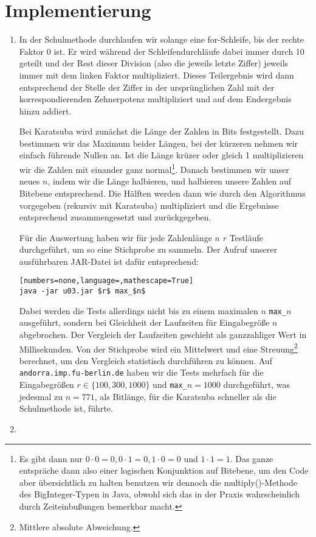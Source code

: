 \documentclass[a4paper,10pt]{scrartcl}
\begin{document}
\section{Implementierung}
\begin{enumerate}
\item   In der Schulmethode durchlaufen wir solange eine for-Schleife, bis der rechte Faktor 0 ist.
        Er wird während der Schleifendurchläufe dabei immer durch 10 geteilt und der Rest dieser Division (also die jeweils letzte Ziffer) jeweils immer mit dem linken Faktor multipliziert. Dieses Teilergebnis wird dann entsprechend der Stelle der Ziffer in der ursprünglichen Zahl mit der korrespondierenden Zehnerpotenz multipliziert und auf dem Endergebnis hinzu addiert.
        
        
        Bei Karatsuba wird zunächst die Länge der Zahlen in Bits festgestellt. Dazu bestimmen wir das Maximum beider Längen, bei der kürzeren nehmen wir einfach führende Nullen an. Ist die Länge krüzer oder gleich 1 multiplizieren wir die Zahlen mit einander ganz normal\footnote{Es gibt dann nur $0 \cdot 0 = 0, 0 \cdot 1 = 0, 1 \cdot 0 = 0$ und $1 \cdot 1 = 1$. Das ganze entspräche dann also einer logischen Konjunktion auf Bitebene, um den Code aber übersichtlich zu halten benutzen wir dennoch die multiply()-Methode des BigInteger-Typen in Java, obwohl sich das in der Praxis wahrscheinlich durch Zeiteinbußungen bemerkbar macht.}. 
        Danach bestimmen wir unser neues $n$, indem wir die Länge halbieren, und halbieren unsere Zahlen auf Bitebene entsprechend. Die Hälften werden dann wie durch den Algorithmus vorgegeben (rekursiv mit Karatsuba) multipliziert und die Ergebnisse entsprechend zusammengesetzt und zurückgegeben.
        
        Für die Auswertung haben wir für jede Zahlenlänge $n$ $r$ Testläufe durchgeführt, um so eine Stichprobe zu sammeln. Der Aufruf unserer ausführbaren JAR-Datei ist dafür entsprechend:
        \begin{lstlisting}[numbers=none,language=,mathescape=True]
java -jar u03.jar $r$ max_$n$ 
        \end{lstlisting}
        Dabei werden die Tests allerdings nicht bis zu einem maximalen $n$ \lstinline!max_!$n$ ausgeführt, sondern bei Gleichheit der Laufzeiten für Eingabegröße $n$ abgebrochen.
        Der Vergleich der Laufzeiten geschieht als ganzzahliger Wert in Millisekunden. Von der Stichprobe wird ein Mittelwert und eine Streuung\footnote{Mittlere absolute Abweichung.} berechnet, um den Vergleich statistisch durchführen zu können. Auf \texttt{andorra.imp.fu-berlin.de} haben wir die Tests mehrfach für die Eingabegrößen $r \in \{100, 300, 1000\}$ und \lstinline!max_!$n = 1000$ durchgeführt, was jedesmal zu $n = 771$, als Bitlänge, für die Karatsuba schneller als die Schulmethode ist, führte.
\item   \textemdash
\end{enumerate}
\end{document}
